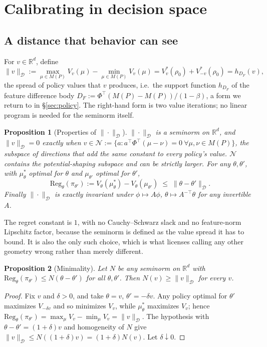 \documentclass{article}
\newtheorem{proposition}{Proposition}
\newcommand{\Dnorm}[1]{\|#1\|_{\mathcal D}}
\begin{document}
\section{Calibrating in decision space}
\label{sec:method}

\subsection{A distance that behavior can see}
\label{sec:seminorm}

For $v\in\mathbb R^d$, define
\[
\Dnorm{v}:=\max_{\mu\in M(P)}V_v(\mu)-\min_{\mu\in M(P)}V_v(\mu)
= V^*_v(\rho_0)+V^*_{-v}(\rho_0)
= h_{D_F}(v),
\]
the spread of policy values that $v$ produces, i.e.\ the support function
$h_{D_F}$ of the feature difference body
$D_F:=\Phi^\top(M(P)-M(P))/(1-\beta)$, a form we return to in
\S\ref{sec:policy}. The right-hand form is two value iterations; no linear
program is needed for the seminorm itself.

\begin{proposition}[Properties of $\Dnorm{\cdot}$]
\label{prop:da-seminorm}
$\Dnorm{\cdot}$ is a seminorm on $\mathbb R^d$, and $\Dnorm{v}=0$ exactly when
$v\in\mathcal N:=\{a: a^\top\Phi^\top(\mu-\nu)=0\ \forall\mu,\nu\in M(P)\}$, the
subspace of directions that add the same constant to every policy's value.
$\mathcal N$ contains the potential-shaping subspace and can be strictly larger.
For any $\theta,\theta'$, with $\mu^*_\theta$ optimal for $\theta$ and
$\mu_{\theta'}$ optimal for $\theta'$,
\[
\mathrm{Reg}_\theta(\pi_{\theta'}):=V_\theta(\mu^*_\theta)-V_\theta(\mu_{\theta'})
\;\le\;\Dnorm{\theta-\theta'}.
\]
Finally $\Dnorm{\cdot}$ is exactly invariant under $\phi\mapsto A\phi$,
$\theta\mapsto A^{-\top}\theta$ for any invertible $A$.
\end{proposition}

The regret constant is $1$, with no Cauchy--Schwarz slack and no feature-norm
Lipschitz factor, because the seminorm is defined as the value spread it has to
bound. It is also the only such choice, which is what licenses calling any
other geometry wrong rather than merely different.

\begin{proposition}[Minimality]
\label{prop:minimal}
Let $N$ be any seminorm on $\mathbb R^d$ with
$\mathrm{Reg}_\theta(\pi_{\theta'})\le N(\theta-\theta')$ for all
$\theta,\theta'$. Then $N(v)\ge\Dnorm{v}$ for every $v$.
\end{proposition}

\begin{proof}
Fix $v$ and $\delta>0$, and take $\theta=v$, $\theta'=-\delta v$. Any policy
optimal for $\theta'$ maximizes $V_{-\delta v}$ and so minimizes $V_v$, while
$\mu^*_\theta$ maximizes $V_v$; hence
$\mathrm{Reg}_\theta(\pi_{\theta'})=\max_\mu V_v-\min_\mu V_v=\Dnorm{v}$. The
hypothesis with $\theta-\theta'=(1+\delta)v$ and homogeneity of $N$ give
$\Dnorm{v}\le N((1+\delta)v)=(1+\delta)N(v)$. Let $\delta\downarrow0$.
\end{proof}
\end{document}
